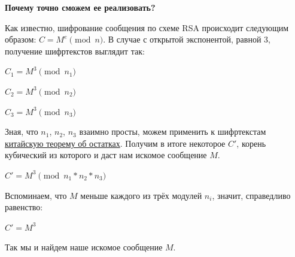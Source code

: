 \documentclass[idxtotoc,hyperref,openany,oneside]{files/crypto} %
\begin{document}
\textbf{Почему точно сможем ее реализовать?}

Как известно, шифрование сообщения по схеме RSA происходит следующим образом: $C = M^e \pmod{n}$. В случае с открытой экспонентой, равной 3, получение шифртекстов выглядит так:
\begin{center}
$C_1 = M^3 \pmod{n_1}$

$C_2 = M^3 \pmod{n_2}$

$C_3 = M^3 \pmod{n_3}$
\end{center}
Зная, что $n_1$, $n_2$, $n_3$ взаимно просты, можем применить к шифртекстам \href{https://ru.wikipedia.org/wiki/\%D0\%9A\%D0\%B8\%D1\%82\%D0\%B0\%D0\%B9\%D1\%81\%D0\%BA\%D0\%B0\%D1\%8F_\%D1\%82\%D0\%B5\%D0\%BE\%D1\%80\%D0\%B5\%D0\%BC\%D0\%B0_\%D0\%BE\%D0\%B1_\%D0\%BE\%D1\%81\%D1\%82\%D0\%B0\%D1\%82\%D0\%BA\%D0\%B0\%D1\%85}{китайскую теорему об остатках}. Получим в итоге некоторое $C'$, корень кубический из которого и даст нам искомое сообщение $M$.
\begin{center}
$C' = M^3 \pmod{n_1*n_2*n_3}$
\end{center}
Вспоминаем, что $M$ меньше каждого из трёх модулей $n_i$, значит, справедливо равенство:
\begin{center}
$C' = M^3$
\end{center}
Так мы и найдем наше искомое сообщение $M$.
\end{document}
